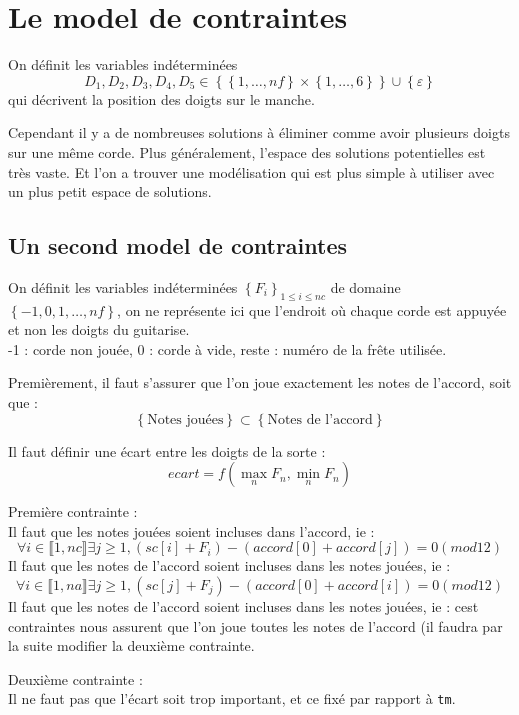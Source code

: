 \section{Le model de contraintes}

On définit les variables indéterminées 
$$D_1,D_2,D_3,D_4,D_5\in\left\{\left\{1, \dots, nf\right\}\times
\left\{1, \dots,6\right\}\right\}\cup\left\{\varepsilon\right\}$$
qui décrivent la position des doigts sur le manche.

Cependant il y a de nombreuses solutions à éliminer comme avoir plusieurs
doigts sur une même corde.
Plus généralement, l'espace des solutions potentielles est très vaste. Et l'on
a trouver une modélisation qui est plus simple à utiliser avec un plus petit
espace de solutions.

\subsection{Un second model de contraintes}

On définit les variables indéterminées $\left\{F_i\right\}_{1\leq i\leq nc}$ de
domaine $\left\{-1, 0, 1, \dots, nf\right\}$, on ne représente ici que
l'endroit où chaque corde est appuyée et non les doigts du guitarise.\\
-1 : corde non jouée, 0 : corde à vide, reste : numéro de la frête utilisée.

Premièrement, il faut s'assurer que l'on joue exactement les notes de l'accord, soit que :
$$\left\{\text{Notes jouées}\right\} \subset \left\{\text{Notes de
l'accord}\right\}$$

Il faut définir une écart entre les doigts de la sorte :
$$ecart = f(\max_n F_n, \min_n F_n)$$

Première contrainte :\\
Il faut que les notes jouées soient incluses dans l'accord, ie :
\begin{equation}
\forall i\in \llbracket1,nc\rrbracket\exists j\geq 1, (sc[i]+F_i)-(accord[0]+accord[j])
= 0(mod 12)
\end{equation}
Il faut que les notes de l'accord soient incluses dans les notes jouées, ie :
\begin{equation}
\forall i\in \llbracket1,na\rrbracket\exists j\geq 1, (sc[j]+F_j)-(accord[0]+accord[i])
= 0(mod 12)
\end{equation}
Il faut que les notes de l'accord soient incluses dans les notes jouées, ie :
cest contraintes nous assurent que l'on joue toutes les notes de l'accord (il
faudra par la suite modifier la deuxième contrainte.

Deuxième contrainte :\\
Il ne faut pas que l'écart soit trop important, et ce fixé par rapport
à \texttt{tm}.

